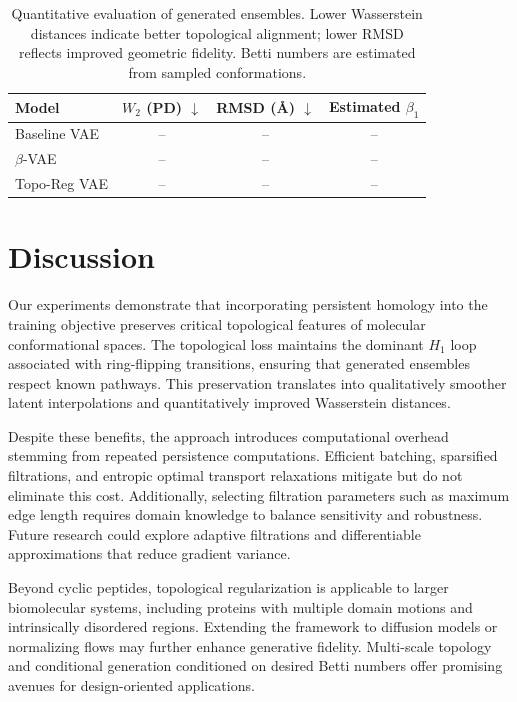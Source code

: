 \documentclass[11pt]{article}
\begin{document}
\begin{table}[t]
    \centering
    \caption{Quantitative evaluation of generated ensembles. Lower Wasserstein distances indicate better topological alignment; lower RMSD reflects improved geometric fidelity. Betti numbers are estimated from sampled conformations.}
    \label{tab:results}
    \begin{tabular}{lccc}
        \toprule
        Model & $W_2$ (PD) $\downarrow$ & RMSD (\AA) $\downarrow$ & Estimated $\beta_1$ \\
        \midrule
        Baseline VAE & -- & -- & -- \\
        $\beta$-VAE & -- & -- & -- \\
        Topo-Reg VAE & -- & -- & -- \\
        \bottomrule
    \end{tabular}
\end{table}

\section{Discussion}
Our experiments demonstrate that incorporating persistent homology into the training objective preserves critical topological features of molecular conformational spaces. The topological loss maintains the dominant $H_1$ loop associated with ring-flipping transitions, ensuring that generated ensembles respect known pathways. This preservation translates into qualitatively smoother latent interpolations and quantitatively improved Wasserstein distances.

Despite these benefits, the approach introduces computational overhead stemming from repeated persistence computations. Efficient batching, sparsified filtrations, and entropic optimal transport relaxations mitigate but do not eliminate this cost. Additionally, selecting filtration parameters such as maximum edge length requires domain knowledge to balance sensitivity and robustness. Future research could explore adaptive filtrations and differentiable approximations that reduce gradient variance.

Beyond cyclic peptides, topological regularization is applicable to larger biomolecular systems, including proteins with multiple domain motions and intrinsically disordered regions. Extending the framework to diffusion models or normalizing flows may further enhance generative fidelity. Multi-scale topology and conditional generation conditioned on desired Betti numbers offer promising avenues for design-oriented applications.
\end{document}
